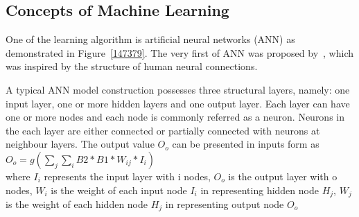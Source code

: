 \subsection{Concepts of Machine Learning}
One of the learning algorithm is artificial neural networks (ANN) as demonstrated in Figure~\ref{147379}. The very first of ANN was proposed by~\citet{McCulloch_1943}, which was inspired by the structure of human neural connections. 
\par 
A typical ANN model construction possesses three structural layers, namely: one input layer, one or more hidden layers and one output layer. Each layer can have one or more nodes and each node is commonly referred as a neuron. Neurons in the each layer are either connected or partially connected with neurons at neighbour layers. The output value $O_o$ can be presented in inputs form as
$O_o = g( \sum_{j} \sum_{i} B2*B1*W_{ij} * I_i)$ \\
where $I_i$ represents the input layer with i nodes, $O_o$ is the output layer with o nodes, $W_{i}$ is the weight of each input node $I_i$ in representing hidden node $H_j$, $W_{j}$ is the weight of each hidden node $H_j$ in representing output node $O_o$
